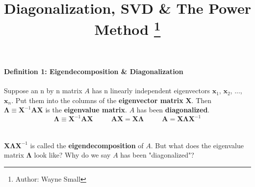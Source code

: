 \documentclass{tufte-handout}
\title{Diagonalization, SVD \& The Power Method \thanks{Author: Wayne Small}}
\begin{document}
\[\]
{\Large\textbf{Definition 1: Eigendecomposition \& Diagonalization}}\\\leavevmode\\
\noindent Suppose an n by n matrix $A$ has n linearly independent eigenvectors $\mathbf{x}_1$, $\mathbf{x}_2$, ..., $\mathbf{x}_n$. Put them into the columns of the \textbf{eigenvector matrix} $\mathbf{X}$. Then $\mathbf{\Lambda}\equiv\mathbf{X}^{-1}\mathbf{A}\mathbf{X}$ is the \textbf{eigenvalue matrix}. $A$ has been \textbf{diagonalized}.
\[
\mathbf{\Lambda}\equiv\mathbf{X}^{-1}\mathbf{A}\mathbf{X}
~~~~~~~~~~~~
\mathbf{A}\mathbf{X}= \mathbf{X}\mathbf{\Lambda}
~~~~~~~~~~~~
\mathbf{A}= \mathbf{X}\mathbf{\Lambda}\mathbf{X}^{-1}
\]\\\leavevmode\\
\noindent $\mathbf{X}\mathbf{\Lambda}\mathbf{X}^{-1}$ is called the \textbf{eigendecomposition} of $A$. But what does the eigenvalue matrix $\mathbf{\Lambda}$ look like? Why do we say $A$ has been "diagonalized"?\\\leavevmode
\end{document}
